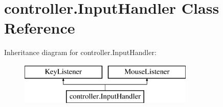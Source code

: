 \hypertarget{classcontroller_1_1_input_handler}{\section{controller.\-Input\-Handler Class Reference}
\label{classcontroller_1_1_input_handler}
}
Inheritance diagram for controller.\-Input\-Handler\-:\begin{figure}[H]
\begin{center}
\leavevmode
\includegraphics[height=2.000000cm]{classcontroller_1_1_input_handler}
\end{center}
\end{figure}

